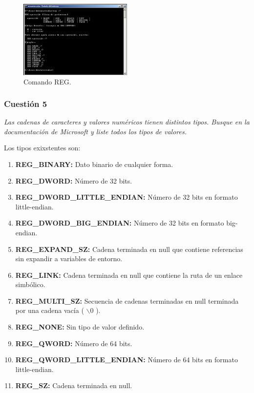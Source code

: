 \begin{figure}[H]
  \begin{center}
    \includegraphics[width=0.5\textwidth]{imagenes/8}
    \caption{Comando REG.}
    \label{fig8}
  \end{center}
\end{figure}

\subsubsection{Cuestión 5}
\textit{Las cadenas de caracteres y valores numéricos tienen distintos tipos. Busque en la documentación de Microsoft y liste todos los tipos de valores.}
\newline

Los tipos exixstentes son: \cite{reg3}
\begin{enumerate}
    \item \textbf{REG\_BINARY: }Dato binario de cualquier forma.
    \item \textbf{REG\_DWORD: }Número de 32 bits.
    \item \textbf{REG\_DWORD\_LITTLE\_ENDIAN: }Número de 32 bits en formato little-endian.
    \item \textbf{REG\_DWORD\_BIG\_ENDIAN:} Número de 32 bits en formato big-endian.
    \item \textbf{REG\_EXPAND\_SZ: }Cadena terminada en null que contiene referencias sin expandir a variables de entorno.
    \item \textbf{REG\_LINK: }Cadena terminada en null que contiene la ruta de un enlace simbólico.
    \item \textbf{REG\_MULTI\_SZ:} Secuencia de cadenas terminadas en null terminada por una cadena vacía ( $\backslash$0 ).
    \item \textbf{REG\_NONE: }Sin tipo de valor definido.
    \item \textbf{REG\_QWORD: }Número de 64 bits.
    \item \textbf{REG\_QWORD\_LITTLE\_ENDIAN:} Número de 64 bits en formato little-endian.
    \item \textbf{REG\_SZ: }Cadena terminada en null.
\end{enumerate}


